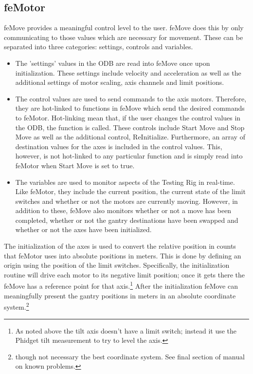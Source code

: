 \documentclass[a4paper,12pt]{article}
\begin{document}
\subsection{feMotor}

feMove provides a meaningful control level to the user.
feMove does this by only communicating to those values which are necessary for movement. 
These can be separated into three categories: settings, controls and variables. 

\begin{itemize}
\item The 'settings' values in the ODB are read into feMove once upon initialization. 
These settings include velocity and acceleration as well as the additional settings of 
motor scaling, axis channels and limit positions. 

\item The control values are used to send 
commands to the axis motors. Therefore, they are hot-linked to functions in feMove which 
send the desired commands to feMotor. Hot-linking mean that, if the user changes the 
control values in the ODB, the function is called. These controls include Start Move 
and Stop Move as well as the additional control, ReInitialize. Furthermore, an array 
of destination values for the axes is included in the control values. This, however, 
is not hot-linked to any particular function and is simply read into feMotor when 
Start Move is set to true. 

\item The variables are used to monitor aspects of the Testing Rig in real-time. Like 
feMotor, they include the current position, the current state of the limit switches and 
whether or not the motors are currently moving. However, in addition to these, feMove 
also monitors whether or not a move has been completed, whether or 
not the gantry destinations have been swapped and whether or not the axes have been initialized. 
\end{itemize}

The initialization of the axes is used to
convert the relative position in counts that feMotor uses into absolute positions in meters. 
This is done by 
defining an origin using the position of the limit switches. 
Specifically, the initialization routine will drive each motor to its negative limit 
position; once it gets there the feMove has a reference point for that axis.\footnote{As noted above
the tilt axis doesn't have a limit switch; instead it use the Phidget tilt measurement to try
to level the axis.}
After the initialization feMove can meaningfully present the gantry positions in 
meters in an absolute coordinate system.\footnote{though not necessary the best coordinate
system. See final section of manual on known problems.}
\end{document}

